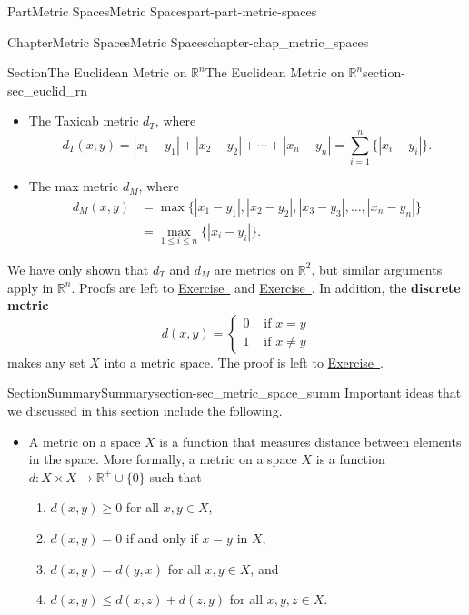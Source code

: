 \documentclass[oneside,10pt,]{book}
\newcommand{\xreffont}{\relax}
\newcommand{\terminology}[1]{\textbf{#1}}
\numberwithin{equation}{chapter}
\newcommand{\R}{\mathbb{R}}
\newcommand{\amp}{&}
\begin{document}
\begin{partptx}{Part}{Metric Spaces}{}{Metric Spaces}{}{}{part-part-metric-spaces}
\begin{chapterptx}{Chapter}{Metric Spaces}{}{Metric Spaces}{}{}{chapter-chap_metric_spaces}
\begin{sectionptx}{Section}{The Euclidean Metric on \(\R^n\)}{}{The Euclidean Metric on \(\R^n\)}{}{}{section-sec_euclid_rn}
\begin{itemize}[label=\textbullet]
%
\item{}The Taxicab metric \(d_T\), where%
\begin{equation*}
d_T(x,y) = |x_1-y_1| + |x_2-y_2| + \cdots + |x_n-y_n| = \sum_{i=1}^n \{|x_i-y_i|\}\text{.}
\end{equation*}
%
\item{}The max metric \(d_M\), where%
\begin{align*}
d_M(x,y) \amp = \max\{| x_1-y_1 |, | x_2-y_2 |, |x_3-y_3|, \ldots, |x_n-y_n| \}\\
\amp = \max_{1 \leq i \leq n} \{|x_i-y_i|\}\text{.}
\end{align*}
%
\end{itemize}
%
\par
We have only shown that \(d_T\) and \(d_M\) are metrics on \(\R^2\), but similar arguments apply in \(\R^n\). Proofs are left to \hyperlink{exercise-ex_Taxicab}{Exercise~{\xreffont 5}} and \hyperlink{exercise-ex_Max}{Exercise~{\xreffont 6}}. In addition, the \terminology{discrete metric} %
\begin{equation*}
d(x,y) = \begin{cases}0 \amp  \text{ if }  x=y \\ 1 \amp  \text{ if }  x \neq y \end{cases}
\end{equation*}
makes any set \(X\) into a metric space. The proof is left to \hyperlink{exercise-ex_MS_discrete}{Exercise~{\xreffont 1}}.%
\end{sectionptx}
%
%
\typeout{************************************************}
\typeout{************************************************}
%
\begin{sectionptx}{Section}{Summary}{}{Summary}{}{}{section-sec_metric_space_summ}
Important ideas that we discussed in this section include the following.%
\begin{itemize}[label=\textbullet]
\item{}A metric on a space \(X\) is a function that measures distance between elements in the space. More formally, a metric on a space \(X\) is a function \(d: X \times X \to \R^+ \cup \{0\}\) such that%
\begin{enumerate}
\item{}\(d(x,y) \geq 0\) for all \(x,y \in X\),%
\item{}\(d(x,y) = 0\) if and only if \(x = y\) in \(X\),%
\item{}\(d(x,y) = d(y,x)\) for all \(x, y \in X\), and%
\item{}\(d(x,y) \leq d(x,z) + d(z,y)\) for all \(x,y,z \in X\).%

\end{enumerate}
\end{itemize}
\end{sectionptx}
\end{chapterptx}
\end{partptx}
\end{document}
